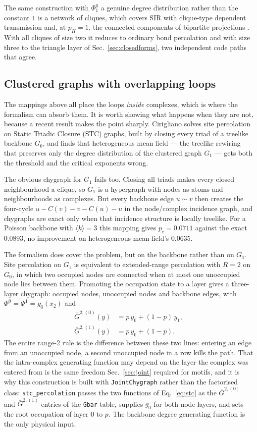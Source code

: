 \documentclass[aps,pre,twocolumn,superscriptaddress,floatfix,longbibliography]{revtex4-2}
\newcommand{\ave}[1]{\langle #1 \rangle}
\newcommand{\code}[1]{\texttt{#1}}
\begin{document}
The same construction with $\Phi^0_1$ a genuine degree distribution rather than
the constant $1$ is a network of cliques, which covers SIR with clique-type
dependent transmission and, at $p_H=1$, the connected components of bipartite
projections \cite{fujiki2024}. With all cliques of size two it reduces to
ordinary bond percolation and with size three to the triangle layer of
Sec.~\ref{sec:closedforms}, two independent code paths that agree.

\subsection{Clustered graphs with overlapping loops}\label{sec:stc}

The mappings above all place the loops \emph{inside} complexes, which is where
the formalism can absorb them. It is worth showing what happens when they are
not, because a recent result makes the point sharply. Cirigliano
\cite{cirigliano2025} solves site percolation on Static Triadic Closure (STC)
graphs, built by closing every triad of a treelike backbone $G_0$, and finds
that heterogeneous mean field --- the treelike rewiring that preserves only the
degree distribution of the clustered graph $G_1$ --- gets both the threshold and
the critical exponents wrong.

The obvious chygraph for $G_1$ fails too. Closing all triads makes every closed
neighbourhood a clique, so $G_1$ is a hypergraph with nodes as atoms and
neighbourhoods as complexes. But every backbone edge $u\sim v$ then creates the
four-cycle $u-C(v)-v-C(u)-u$ in the node/complex incidence graph, and chygraphs
are exact only when that incidence structure is locally treelike. For a Poisson
backbone with $\ave{k}=3$ this mapping gives $p_c=0.0711$ against the exact
$0.0893$, no improvement on heterogeneous mean field's $0.0635$.

The formalism does cover the problem, but on the backbone rather than on $G_1$.
Site percolation on $G_1$ is equivalent to extended-range percolation with
$R=2$ on $G_0$, in which two occupied nodes are connected when at most one
unoccupied node lies between them. Promoting the occupation state to a layer
gives a three-layer chygraph: occupied nodes, unoccupied nodes and backbone
edges, with $\Phi^0=\Phi^1=g_0(x_2)$ and
\begin{align}
  \bar G^{2,(0)}(y)&=p\,y_0+(1-p)\,y_1,\nonumber\\
  \bar G^{2,(1)}(y)&=p\,y_0+(1-p).
  \label{eq:stc}
\end{align}
The entire range-2 rule is the difference between these two lines: entering an
edge from an unoccupied node, a second unoccupied node in a row kills the path.
That the intra-complex generating function may depend on the layer the complex
was entered from is the same freedom Sec.~\ref{sec:joint} required for motifs,
and it is why this construction is built with \code{JointChygraph} rather than
the factorised class: \code{stc\_percolation} passes the two functions of
Eq.~\eqref{eq:stc} as the $\bar G^{2,(0)}$ and $\bar G^{2,(1)}$ entries of the
\code{Gbar} table, supplies $g_0$ for both node layers, and sets the root
occupation of layer 0 to $p$. The backbone degree generating function is the
only physical input.
\end{document}
